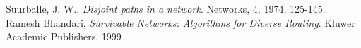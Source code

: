 \documentclass[a4paper,12pt]{article}
\begin{document}
\begin{thebibliography}{9}

  Suurballe, J. W.,
  \emph{Disjoint paths in a network}.
  Networks, 4, 1974, 125-145. 
  Ramesh Bhandari,
  \emph{Survivable Networks: Algorithms for Diverse Routing}.
  Kluwer Academic Publishers, 1999 



\end{thebibliography}

\end{document}
